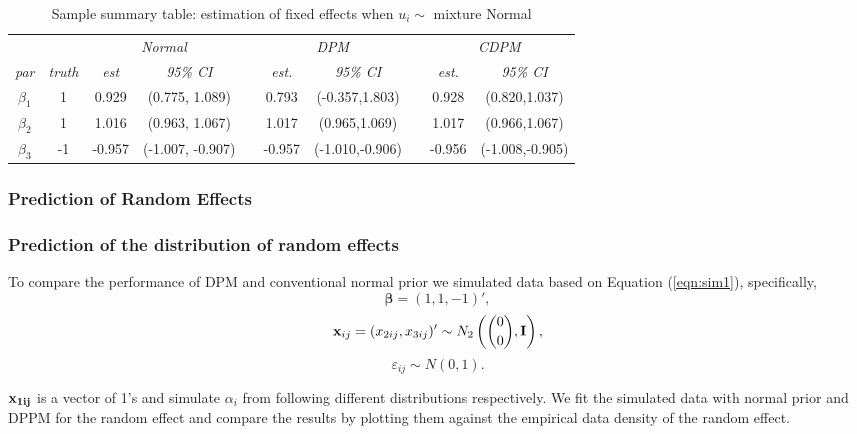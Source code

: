 \documentclass[12pt]{article}
\begin{document}
\begin{table}[H]
\begin{center}
\caption{Sample summary table: estimation of fixed effects when $u_i\sim$ mixture Normal}
\begin{tabular}{cccccccccc}
\hline
&  & \multicolumn{2}{c}{\emph{Normal}} && \multicolumn{2}{c}{\emph{DPM}} & &\multicolumn{2}{c}{\emph{CDPM}} \\
\cline{3-4}\cline{6-7}\cline{9-10}
\emph{par}& \emph{truth}& \emph{est}    & \emph{95\% CI} & & \emph{est.}    & \emph{95\% CI}  && \emph{est.} & \emph{95\% CI}\\
\hline
$\beta_1$ & 1 & 0.929 &(0.775, 1.089)& &0.793 & (-0.357,1.803)& & 0.928&(0.820,1.037)\\
$\beta_2$ & 1 & 1.016&(0.963, 1.067) & & 1.017& (0.965,1.069)& &1.017 &(0.966,1.067)\\
$\beta_3$ & -1 & -0.957&(-1.007, -0.907) & & -0.957& (-1.010,-0.906)& &-0.956 &(-1.008,-0.905)\\
\hline
\end{tabular}
\end{center}
\end{table}





\subsubsection{Prediction of Random Effects}%



\subsubsection*{Prediction of the distribution of random effects}%

To compare the performance of DPM and conventional normal prior we simulated data based on Equation (\ref{eqn:sim1}), specifically,
\[\boldsymbol{\beta}=(1,1,-1)',\]
\[{\bf x}_{ij}=(x_{2ij}, x_{3ij})'\sim N_2\left({0 \choose 0},{\bf I}\right),\]
\[\varepsilon_{ij}\sim N(0,1).\] 

${\bf x_{1ij}}$ is a vector of 1's and simulate $\alpha_i$ from following different distributions respectively. We fit the simulated data with normal prior and DPPM for the random effect and compare the results by plotting them against the empirical data density of the random effect.
\end{document}
